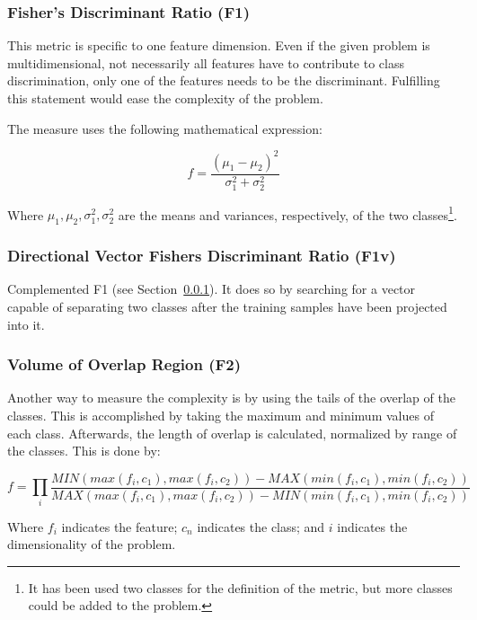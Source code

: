 \subsubsection{Fisher's Discriminant Ratio (F1)}\label{sec:f1}

This metric is specific to one feature dimension. Even if the given problem is 
multidimensional, not necessarily all features have to contribute to class 
discrimination, only one of the features needs to be the discriminant. 
Fulfilling this statement would ease the complexity of the problem.

The measure uses the following mathematical expression:

\[ f = \frac{(\mu _1 - \mu _2)^2}{\sigma _1^2 + \sigma _2^2} \]

Where \(\mu _1,\mu _2,\sigma _1^2, \sigma _2^2\) are the means and variances, 
respectively, of the two classes\footnote{It has been used two classes for the 
definition of the metric, but more classes could be added to the problem.}.

\subsubsection{Directional Vector Fishers Discriminant Ratio (F1v)}

Complemented F1 (see Section~\ref{sec:f1}). It does so by searching for a vector
capable of separating two classes after the training  samples have been projected
into it.

\subsubsection{Volume of Overlap Region (F2)}

Another way to measure the complexity is by using the tails of the overlap of 
the classes. This is accomplished by taking the maximum and minimum values of 
each class. Afterwards, the length of overlap is calculated, normalized by 
range of the classes. This is done by:

\[ f = \prod_{i} \frac{MIN(max(f_i, c_1), max(f_i, c_2)) - MAX(min(f_i, c_1), min(f_i, c_2))}{MAX(max(f_i, c_1), max(f_i, c_2)) - MIN(min(f_i, c_1), min(f_i, c_2))}\]

Where \(f_i\) indicates the feature; \(c_n\) indicates the class; and \(i\) 
indicates the dimensionality of the problem.

